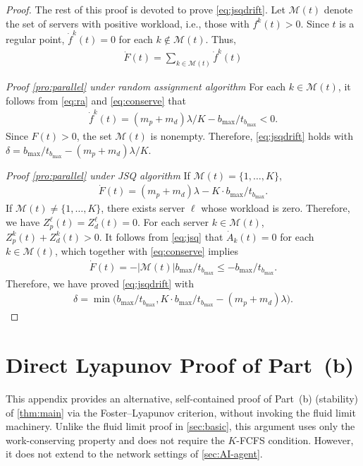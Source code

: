 \documentclass[11pt]{article}
\theoremstyle{plain}
\theoremstyle{definition}
\theoremstyle{remark}
\providecommand{\abs}[1]{\lvert#1\rvert}
\begin{document}
\begin{proof}
 The rest of this proof is devoted to prove \cref{eq:jsqdrift}. 
  Let $\mathcal{M}(t)$ denote the set  of  servers with positive workload, i.e., those with $f^k(t)>0$.
  Since $t$ is a regular point, $\dot f^k(t)=0$ for each $k\not\in \mathcal{M}(t)$. Thus,
\begin{align*}
    \dot F(t)=\sum_{k\in \mathcal{M}(t)} \dot f^k(t)
  \end{align*}
  
  \noindent\textit{Proof \cref{pro:parallel} under random assignment algorithm}\;
  For each $k\in \mathcal{M}(t)$, it follows from \cref{eq:ra} and \cref{eq:conserve} that 
  \begin{align*}
    \dot f^k(t)= (m_p+m_d)\lambda/K- b_{\max}/t_{b_{\max}} <0.
  \end{align*}
  Since $F(t)>0$, the set $\mathcal{M}(t)$ is nonempty. Therefore, \cref{eq:jsqdrift} holds with 
  $\delta=b_{\max}/t_{b_{\max}} -(m_p+m_d)\lambda/K$.
  
  
 \noindent\textit{Proof \cref{pro:parallel} under JSQ algorithm}\; 
 If $\mathcal{M}(t)=\{1, \ldots, K\}$,
\begin{align*}
    \dot F(t) = (m_p+m_d)\lambda - K\cdot b_{\max}/t_{b_{\max}}.
  \end{align*}
If $\mathcal{M}(t) \neq \{1, \ldots, K\}$, there exists server $\ell$ whose
workload is zero. Therefore, we have $Z_p^\ell(t)=Z_d^\ell(t)=0$. For each 
server $k\in \mathcal{M}(t)$,  $Z_p^k(t)+Z_d^k(t)>0$. It follows from \cref{eq:jsq} that $\dot A_k(t)=0$ for each $k\in \mathcal{M}(t)$, which together with \cref{eq:conserve} implies 
\begin{align*}
    \dot F(t) = - \abs{\mathcal{M}(t)}b_{\max}/t_{b_{\max}}
    \le - b_{\max}/t_{b_{\max}}.
\end{align*}
Therefore, we have proved \cref{eq:jsqdrift} with 
\begin{align*}
    \delta = \min\Big( b_{\max}/t_{b_{\max}},  K\cdot b_{\max}/t_{b_{\max}}- (m_p+m_d)\lambda\Big).
\end{align*}
  \end{proof}


\section{Direct Lyapunov Proof of  Part~(b)}\label{sec:proof-thm-main}

This appendix provides an alternative, self-contained proof of Part~(b) (stability) of \cref{thm:main} via the Foster--Lyapunov criterion, without invoking the fluid limit machinery. Unlike the fluid limit proof in \cref{sec:basic}, this argument uses only the work-conserving property and does not require the $K$-FCFS condition. However, it does not extend to the network settings of \cref{sec:AI-agent}.
\end{document}
